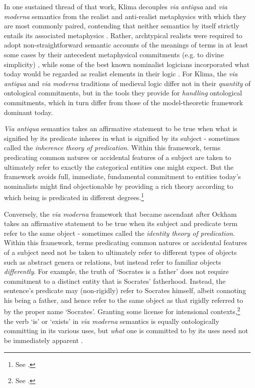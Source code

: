 \documentclass[]{article}
\begin{document}
In one sustained thread of that work, 
Klima decouples \emph{via antiqua} and \emph{via moderna} semantics 
from the realist and anti-realist metaphysics with which they are most commonly paired,
contending that neither semantics by itself strictly entails its associated metaphysics \autocite{Klima1999,Klima2011}. 
Rather, archtypical realists were required to adopt non-straightforward semantic accounts of the meanings of terms in at least some cases by their antecedent metaphysical commitments (e.g. to divine simplicity) \autocite{Klima2002b},
while some of the best known nominalist logicians incorporated what today would be regarded as realist elements in their logic \autocite{Klima2005}. 
For Klima, the \emph{via antiqua} and \emph{via moderna} traditions of medieval logic 
differ not in their \emph{quantity} of ontological commitments, 
but in the tools they provide for \emph{handling} ontological commitments, 
which in turn differ from those of the model-theoretic framework dominant today. 

\emph{Via antiqua} semantics takes an affirmative statement to be true when what is signified by its predicate inheres in what is signified by its subject - 
sometimes called the \emph{inherence theory of predication}. 
Within this framework, 
terms predicating common natures or accidental features of a subject are taken to ultimately refer to exactly the categorical entities one might expect. 
But the framework 
avoids full, immediate, fundamental commitment to entities today's nominalists might find objectionable by providing a rich theory according to which being is predicated in different degrees.\footnote{See \autocite{Klima2002}.}

Conversely, the \emph{via moderna} framework that became ascendant after Ockham 
takes an affirmative statement to be true when its subject and predicate term refer to the same object 
 - sometimes called the \emph{identity theory of predication}. 
Within this framework, 
terms predicating common natures or accidental features of a subject need not be taken to ultimately refer to different types of objects such as abstract genera or relations, 
but instead refer to familiar objects \emph{differently}. 
For example, the truth of `Socrates is a father' does not require commitment to a distinct entity that is Socrates' fatherhood.
Instead, the sentence's predicate may (non-rigidly) refer to Socrates himself, 
albeit connoting his being a father, 
and hence refer to the same object as that rigidly referred to by the proper name `Socrates'. 
Granting some license for intensional contexts,\footnote{See \autocite{Klima2005}.} 
the verb `is' or `exists' in \emph{via moderna} semantics is equally ontologically committing in its various uses, 
but \emph{what} one is committed to by its uses need not be immediately apparent  \autocite[437-430]{Klima2008a}. 
\end{document}
